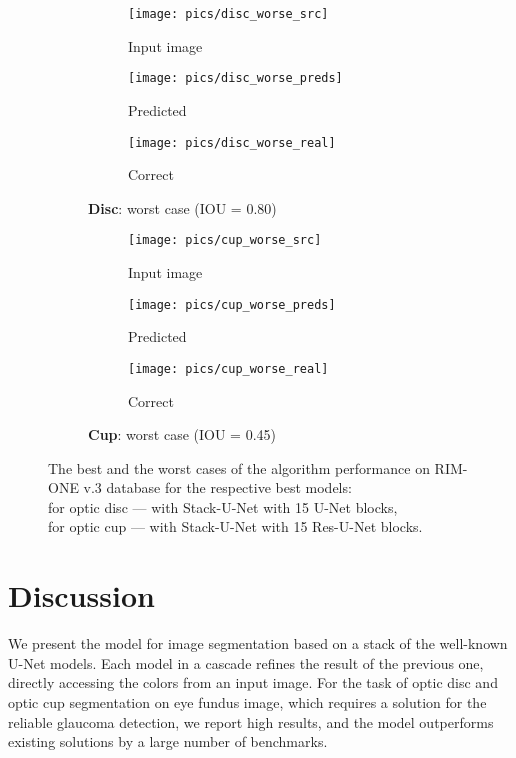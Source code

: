 \documentclass{llncs}
\begin{document}
\begin{figure}[h!]
	\begin{subfigure}[t]{0.5\textwidth}
		\begin{subfigure}[t]{0.3\textwidth}
			\texttt{[image: pics/disc\_worse\_src]} 
			\caption*{Input image}
		\end{subfigure}
		\begin{subfigure}[t]{0.3\textwidth}
			\texttt{[image: pics/disc\_worse\_preds]} 
			\caption*{Predicted}
		\end{subfigure}
		\begin{subfigure}[t]{0.3\textwidth}
			\texttt{[image: pics/disc\_worse\_real]} 
			\caption*{Correct}
		\end{subfigure}
		\caption*{\textbf{Disc}: worst case (IOU = 0.80)}
	\end{subfigure}
	\hspace{0.15cm}
	\begin{subfigure}[t]{0.5\textwidth}
		\begin{subfigure}[t]{0.3\textwidth}
			\texttt{[image: pics/cup\_worse\_src]} 
			\caption*{Input image}
		\end{subfigure}
		\begin{subfigure}[t]{0.3\textwidth}
			\texttt{[image: pics/cup\_worse\_preds]} 
			\caption*{Predicted}
		\end{subfigure}
		\begin{subfigure}[t]{0.3\textwidth}
			\texttt{[image: pics/cup\_worse\_real]} 
			\caption*{Correct}
		\end{subfigure}
		\caption*{\textbf{Cup}: worst case (IOU = 0.45)}
	\end{subfigure}
	
	\caption{The best and the worst cases of the algorithm performance on RIM-ONE v.3 database for the respective best models: \\ for optic disc --- with Stack-U-Net with 15 U-Net blocks, \\ for optic cup --- with Stack-U-Net with 15 Res-U-Net blocks.}
	\label{fig:visual_results}
\end{figure}

\section{Discussion}

We present the model for image segmentation based on a stack of the well-known U-Net models. Each model in a cascade refines the result of the previous one, directly accessing the colors from an input image. For the task of optic disc and optic cup segmentation on eye fundus image, which requires a solution for the reliable glaucoma detection, we report high results, and the model outperforms existing solutions by a large number of benchmarks.
\end{document}
